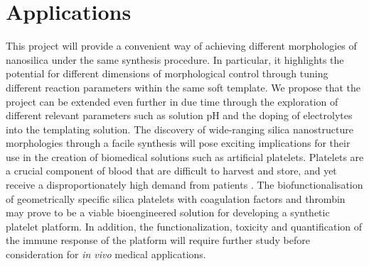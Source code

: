 \documentclass[a4paper,12pt]{article}
\begin{document}
	\section*{Applications}
	 This project will provide a convenient way of achieving different morphologies of nanosilica under the same synthesis procedure. In particular, it highlights the potential for different dimensions of morphological control through tuning different reaction parameters within the same soft template. We propose that the project can be extended even further in due time through the exploration of different relevant parameters such as solution pH and the doping of electrolytes into the templating solution.
	 \bigbreak
The discovery of wide-ranging silica nanostructure morphologies through a facile synthesis will pose exciting implications for their use in the creation of biomedical solutions such as artificial platelets. Platelets are a crucial component of blood that are difficult to harvest and store, and yet receive a disproportionately high demand from patients \cite{dolgin2017}. The biofunctionalisation of geometrically specific silica platelets with coagulation factors and thrombin may prove to be a viable bioengineered solution for developing a synthetic platelet platform. In addition, the functionalization, toxicity and quantification of the immune response of the platform will require further study before consideration for \textit{in vivo} medical applications.

	\printbibliography
	 
	
\end{document}
